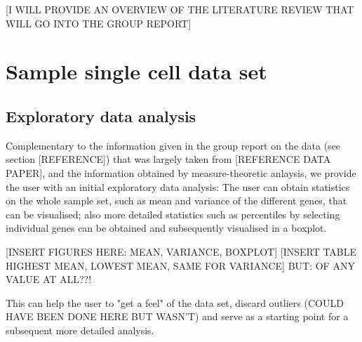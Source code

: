 \documentclass[journal, a4paper]{IEEEtran}
\begin{document}
[I WILL PROVIDE AN OVERVIEW OF THE LITERATURE REVIEW THAT WILL GO INTO THE GROUP REPORT]



\section{Sample single cell data set}


\subsection{Exploratory data analysis}

Complementary to the information given in the group report on the data (see section [REFERENCE]) that was largely taken from [REFERENCE DATA PAPER], and the information obtained by measure-theoretic anlaysis, we provide the user with an initial exploratory data analysis:
The user can obtain statistics on the whole sample set, such as mean and variance of the different genes, that can be visualised; also more detailed statistics such as percentiles by selecting individual genes can be obtained and subsequently visualised in a boxplot. 

[INSERT FIGURES HERE: MEAN, VARIANCE, BOXPLOT] 
[INSERT TABLE HIGHEST MEAN, LOWEST MEAN, SAME FOR VARIANCE]
BUT: OF ANY VALUE AT ALL??!


This can help the user to "get a feel" of the data set, discard outliers (COULD HAVE BEEN DONE HERE BUT WASN'T) and serve as a starting point for a subsequent more detailed analysis. 


\end{document}
